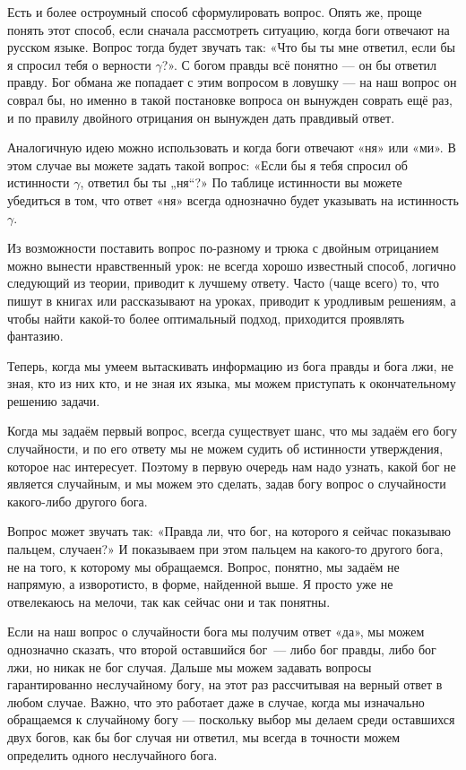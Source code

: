 Есть и более остроумный способ сформулировать вопрос. Опять же, проще понять этот способ, если сначала рассмотреть ситуацию, когда боги отвечают на русском языке. Вопрос тогда будет звучать так: «Что бы ты мне ответил, если бы я спросил тебя о верности $\gamma$?». С богом правды всё понятно — он бы ответил правду. Бог обмана же попадает с этим вопросом в ловушку — на наш вопрос он соврал бы, но именно в такой постановке вопроса он вынужден соврать ещё раз, и по правилу двойного отрицания он вынужден дать правдивый ответ.

Аналогичную идею можно использовать и когда боги отвечают «ня» или «ми». В этом случае вы можете задать такой вопрос: «Если бы я тебя спросил об истинности $\gamma$, ответил бы ты „ня“?» По таблице истинности вы можете убедиться в том, что ответ «ня» всегда однозначно будет указывать на истинность $\gamma$.

Из возможности поставить вопрос по-разному и трюка с двойным отрицанием можно вынести нравственный урок: не всегда хорошо известный способ, логично следующий из теории, приводит к лучшему ответу. Часто (чаще всего) то, что пишут в книгах или рассказывают на уроках, приводит к уродливым решениям, а чтобы найти какой-то более оптимальный подход, приходится проявлять фантазию.

Теперь, когда мы умеем вытаскивать информацию из бога правды и бога лжи, не зная, кто из них кто, и не зная их языка, мы можем приступать к окончательному решению задачи.

Когда мы задаём первый вопрос, всегда существует шанс, что мы задаём его богу случайности, и по его ответу мы не можем судить об истинности утверждения, которое нас интересует. Поэ\-то\-му в первую очередь нам надо узнать, какой бог не является случайным, и мы можем это сделать, задав богу вопрос о случайности какого-либо другого бога.

Вопрос может звучать так: «Правда ли, что бог, на которого я сейчас показываю пальцем, случаен?» И показываем при этом пальцем на какого-то другого бога, не на того, к которому мы обращаемся. Вопрос, понятно, мы задаём не напрямую, а изворотисто, в форме, найденной выше. Я просто уже не отвелекаюсь на мелочи, так как сейчас они и так понятны.

Если на наш вопрос о случайности бога мы получим ответ «да», мы можем однозначно сказать, что второй оставшийся бог~--- либо бог правды, либо бог лжи, но никак не бог случая. Дальше мы можем задавать вопросы гарантированно неслучайному богу, на этот раз рассчитывая на верный ответ в любом случае. Важно, что это работает даже в случае, когда мы изначально обращаемся к случайному богу — поскольку выбор мы делаем среди оставшихся двух богов, как бы бог случая ни ответил, мы всегда в точности можем определить одного неслучайного бога.

